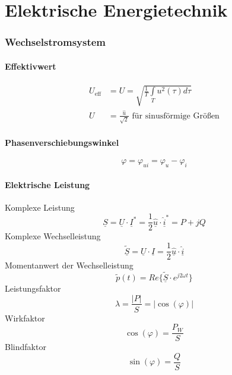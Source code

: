\documentclass[a4paper,twocolumn,10pt]{article}
\begin{document}
\tableofcontents
\newpage

\part{Elektrische Energietechnik}

\section{Wechselstromsystem}

\subsection{Effektivwert}
\begin{equation*}
\begin{split}
U_{\text{eff}}&=U=\sqrt{\frac{1}{T}\int\limits_Tu^2(\tau)d\tau}\\
U&=\frac{\hat{u}}{\sqrt{2}}\text{ für sinusförmige Größen}
\end{split}
\end{equation*}

\subsection{Phasenverschiebungswinkel}
\begin{equation*}
\varphi=\varphi_{ui}=\varphi_u-\varphi_i
\end{equation*}

\subsection{Elektrische Leistung}
Komplexe Leistung
\begin{equation*}
\underline{S}=\underline{U}\cdot\underline{I}^*=\frac{1}{2}\underline{\hat{u}}\cdot\underline{\hat{i}}^*=P+jQ
\end{equation*}
Komplexe Wechselleistung
\begin{equation*}
\underline{\tilde{S}}=\underline{U}\cdot\underline{I}=\frac{1}{2}\underline{\hat{u}}\cdot\underline{\hat{i}}
\end{equation*}
Momentanwert der Wechselleistung
\begin{equation*}
\tilde{p}(t)=Re\{\tilde{\underline{S}}\cdot e^{j2\omega t}\}
\end{equation*}
Leistungsfaktor
\begin{equation*}
\lambda=\frac{|P|}{S}=|\cos(\varphi)|
\end{equation*}
Wirkfaktor
\begin{equation*}
\cos(\varphi)=\frac{P_W}{S}
\end{equation*}
Blindfaktor
\begin{equation*}
\sin(\varphi)=\frac{Q}{S}
\end{equation*}
\end{document}
